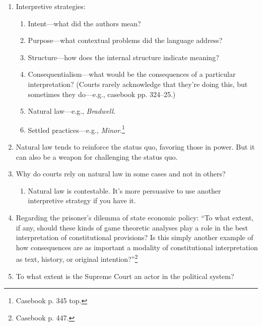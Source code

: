 \begin{enumerate}
    \item Interpretive strategies:
    \begin{enumerate}
        \item Intent---what did the authors mean?
        \item Purpose---what contextual problems did the language address?
        \item Structure---how does the internal structure indicate meaning?
        \item Consequentialism---what would be the consequences of a 
        particular interpretation? (Courts rarely acknowledge that they're 
        doing this, but sometimes they do---e.g., casebook pp. 324--25.)
        \item Natural law---e.g., \emph{Bradwell}.
        \item Settled practices---e.g., \emph{Minor}.\footnote{Casebook p. 345 
        top.}
    \end{enumerate}
    \item Natural law tends to reinforce the status quo, favoring those in 
    power. But it can also be a weapon for challenging the status quo.
    \item Why do courts rely on natural law in some cases and not in others?
    \begin{enumerate}
        \item Natural law is contestable. It's more persuasive to use another 
        interpretive strategy if you have it.
    \end{enumerate}
    \item Regarding the prisoner's dilemma of state economic policy: ``To what 
    extent, if any, should these kinds of game theoretic analyses play a role 
    in the best interpretation of constitutional provisions? Is this simply 
    another example of how consequences are as important a modality of 
    constitutional interpretation as text, history, or original 
    intention?''\footnote{Casebook p. 447.}
    \item To what extent is the Supreme Court an actor in the political 
    system?
\end{enumerate}

